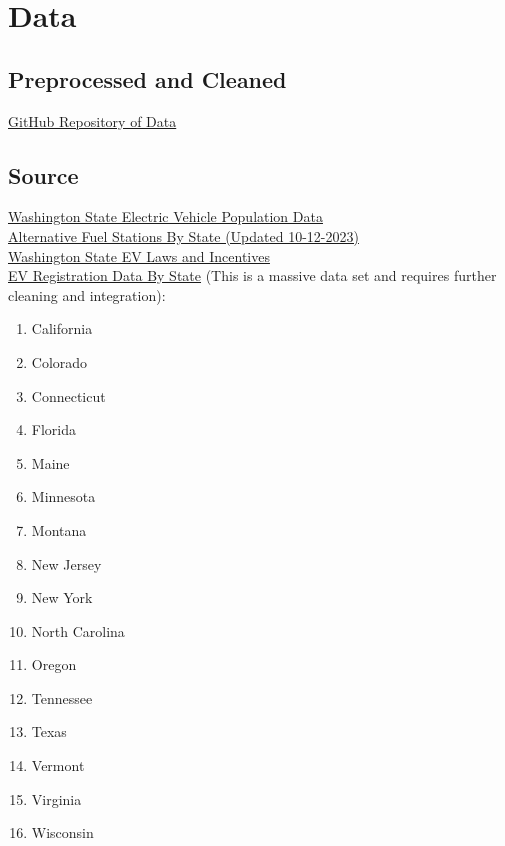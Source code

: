 \documentclass{article}
\begin{document}
\section*{Data}
\subsection*{Preprocessed and Cleaned}
\href{https://github.com/mk-imagine/csc805g5/tree/main/data}{GitHub Repository of Data}
\subsection*{Source}
\href{https://data.wa.gov/Transportation/Electric-Vehicle-Population-Data/f6w7-q2d2}{Washington State Electric Vehicle Population Data}\vspace*{5pt}\\
\href{https://afdc.energy.gov/data_download}{Alternative Fuel Stations By State (Updated 10-12-2023)}\vspace*{5pt}\\
\href{https://afdc.energy.gov/data_download}{Washington State EV Laws and Incentives}\vspace*{5pt}\\
\href{https://www.atlasevhub.com/materials/state-ev-registration-data/}{EV
Registration Data By State} (This is a massive data set and requires further
cleaning and integration):
\begin{multicols}{4}
    \begin{enumerate}[topsep=0pt, partopsep=0pt, itemsep=1pt, parsep=1pt]
        \item California
        \item Colorado
        \item Connecticut
        \item Florida
        \item Maine
        \item Minnesota
        \item Montana
        \item New Jersey
        \item New York
        \item North Carolina
        \item Oregon
        \item Tennessee
        \item Texas
        \item Vermont
        \item Virginia
        \item Wisconsin
    \end{enumerate}
\end{multicols}
\end{document}
